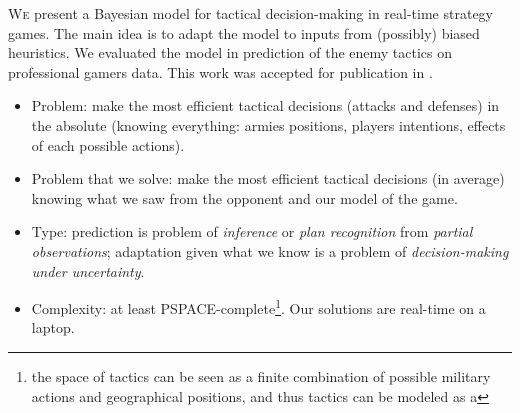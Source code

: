 


\lettrine{W}{e} present a Bayesian model for tactical decision-making in real-time strategy games. The main idea is to adapt the model to inputs from (possibly) biased heuristics. We evaluated the model in prediction of the enemy tactics on professional gamers data. This work was accepted for publication in \citep{SYNNAEVE:Tactics}.

\chaptertoc

\begin{itemize}
\item Problem: make the most efficient tactical decisions (attacks and defenses) in the absolute (knowing everything: armies positions, players intentions, effects of each possible actions).
\item Problem that we solve: make the most efficient tactical decisions (in average) knowing what we saw from the opponent and our model of the game. 
\item Type: prediction is problem of \textit{inference} or \textit{plan recognition} from \textit{partial observations}; adaptation given what we know is a problem of \textit{decision-making under uncertainty}. 
\item Complexity: at least PSPACE-complete\footnote{the space of tactics can be seen as a finite combination of possible military actions and geographical positions, and thus tactics can be modeled as a }. %
Our solutions are real-time on a laptop.
\end{itemize}


